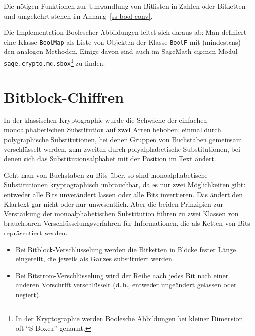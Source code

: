 \begin{refsegment}
Die nötigen Funktionen zur Umwandlung von Bitlisten in Zahlen oder Bitketten
und umgekehrt stehen im Anhang~\ref{ss-bool-conv}.

Die Implementation Boolescher
Abbildungen leitet
sich daraus ab: Man definiert
eine Klasse {\tt BoolMap} als Liste von Objekten der Klasse {\tt BoolF} mit
(mindestens) den analogen Methoden. Einige davon sind auch im SageMath-eigenen Modul
{\tt sage.crypto.mq.sbox}\footnote{%
  In der Kryptographie werden Boolesche Abbildungen bei kleiner Dimension
  oft "`S-Boxen"' genannt.
} zu finden.


\newpage
\section{Bitblock-Chiffren}\label{s-bool-bitbl}

In der klassischen Kryptographie wurde die Schwäche der einfachen
monoalphabetischen Substitution auf zwei Arten behoben: einmal durch
polygraphische
Substitutionen,
bei denen Gruppen von Buchstaben
gemeinsam verschlüsselt werden, zum zweiten durch polyalphabetische
Substitutionen,
bei denen sich das Substitutionsalphabet mit der Position im Text ändert.

Geht man von Buchstaben zu Bits über, so sind monoalphabetische
Substitutionen kryptographisch unbrauchbar, da es nur zwei
Möglichkeiten gibt: entweder alle Bits unverändert lassen oder alle
Bits invertieren. Das ändert den Klartext gar nicht oder nur
unwesentlich. Aber die beiden Prinzipien zur Verstärkung der
monoalphabetischen Substitution führen zu zwei Klassen von brauchbaren
Verschlüsselungsverfahren für Informationen, die als Ketten von Bits
repräsentiert werden:
\begin{itemize}
   \item Bei Bitblock-Verschlüsselung
      werden die Bitketten in Blöcke
      fester Länge eingeteilt, die jeweils als Ganzes substituiert
      werden.
   \item Bei Bitstrom-Verschlüsselung
      wird der Reihe nach jedes Bit
      nach einer anderen Vorschrift verschlüsselt (d.\,h., entweder
      ungeändert gelassen oder negiert).
\end{itemize}


\end{refsegment}
